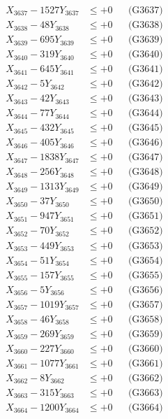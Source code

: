 \documentclass[a4paper,10pt]{article}
\begin{document}
{\begin{align}
X_{3637} - 1527Y_{3637} &\leq +0 && \text{(G3637)} \\
X_{3638} - 48Y_{3638} &\leq +0 && \text{(G3638)} \\
X_{3639} - 695Y_{3639} &\leq +0 && \text{(G3639)} \\
X_{3640} - 319Y_{3640} &\leq +0 && \text{(G3640)} \\
\allowbreak
X_{3641} - 645Y_{3641} &\leq +0 && \text{(G3641)} \\
X_{3642} - 5Y_{3642} &\leq +0 && \text{(G3642)} \\
X_{3643} - 42Y_{3643} &\leq +0 && \text{(G3643)} \\
X_{3644} - 77Y_{3644} &\leq +0 && \text{(G3644)} \\
X_{3645} - 432Y_{3645} &\leq +0 && \text{(G3645)} \\
X_{3646} - 405Y_{3646} &\leq +0 && \text{(G3646)} \\
X_{3647} - 1838Y_{3647} &\leq +0 && \text{(G3647)} \\
X_{3648} - 256Y_{3648} &\leq +0 && \text{(G3648)} \\
X_{3649} - 1313Y_{3649} &\leq +0 && \text{(G3649)} \\
X_{3650} - 37Y_{3650} &\leq +0 && \text{(G3650)} \\
\allowbreak
X_{3651} - 947Y_{3651} &\leq +0 && \text{(G3651)} \\
X_{3652} - 70Y_{3652} &\leq +0 && \text{(G3652)} \\
X_{3653} - 449Y_{3653} &\leq +0 && \text{(G3653)} \\
X_{3654} - 51Y_{3654} &\leq +0 && \text{(G3654)} \\
X_{3655} - 157Y_{3655} &\leq +0 && \text{(G3655)} \\
X_{3656} - 5Y_{3656} &\leq +0 && \text{(G3656)} \\
X_{3657} - 1019Y_{3657} &\leq +0 && \text{(G3657)} \\
X_{3658} - 46Y_{3658} &\leq +0 && \text{(G3658)} \\
X_{3659} - 269Y_{3659} &\leq +0 && \text{(G3659)} \\
X_{3660} - 227Y_{3660} &\leq +0 && \text{(G3660)} \\
\allowbreak
X_{3661} - 1077Y_{3661} &\leq +0 && \text{(G3661)} \\
X_{3662} - 8Y_{3662} &\leq +0 && \text{(G3662)} \\
X_{3663} - 315Y_{3663} &\leq +0 && \text{(G3663)} \\
X_{3664} - 1200Y_{3664} &\leq +0 && \text{(G3664)} \\

\end{align}}
\end{document}
